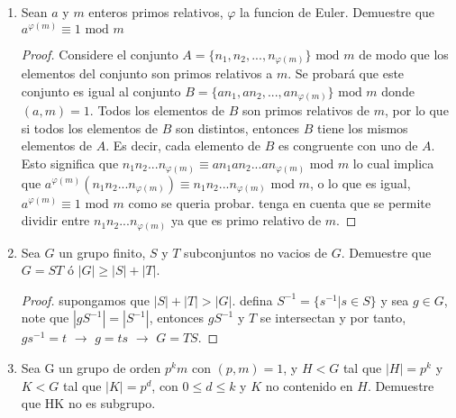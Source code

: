 \documentclass{article}
\theoremstyle{break}
\begin{document}
\begin{enumerate}
\begin{proof}
			Sea $m$ el numero de subgrupos de $G$, sabemos que $<g>$ es el subgrupo mas pequeño que contiene a $g$. Asi, fije $g_1\in G\backslash\{e\}$. Si $<g_1>=G$ termina la prueba, de lo contrario, considere $g_2\in G\backslash\{e\cup<g_1>\}$. Si $<g_1>\cup <g_2>=G$ entonces termina la prueba. Aplicando este razonamiendo, existe un $n\in\mathbb{N}$, con $n\leq m$ tal que 
			
			$$
			G=\displaystyle\bigcup_{i=1}^{n}{<g_i>}
			$$
			Pues de lo contrario $G$ contendria mas subgrupos que los $m$ existentes, lo cual no ocurre.
			Y como cada $<g_i>$ es finito, la union de todos ellos tambien es finita, luego G es finito.
		\end{proof}
		
		\item Sean $a$ y $m$ enteros primos relativos, $\varphi$ la funcion de Euler. Demuestre que $a^{\varphi (m)}\equiv 1 \mbox{ mod }m$
		
		\begin{proof}
			Considere el conjunto $A=\{n_1,n_2,...,n_{\varphi(m)}\}\mbox{ mod } m$ de modo que los elementos del conjunto son primos relativos a $m$. Se probar\'a que este conjunto es igual al conjunto $B=\{an_1,an_2,...,an_{\varphi (m)}\}\mbox{ mod }m$ donde $(a,m)=1$. Todos los elementos de $B$ son primos relativos de $m$, por lo que si todos los elementos de $B$ son distintos, entonces $B$ tiene los mismos elementos de $A$. Es decir, cada elemento de $B$ es congruente con uno de $A$. Esto significa que $n_1n_2...n_{\varphi(m)}\equiv an_1an_2...an_{\varphi(m)} \mbox{ mod }m$ lo cual implica que $a^{\varphi(m)}(n_1n_2...n_{\varphi(m)})\equiv n_1n_2...n_{\varphi(m)}\mbox{ mod }m$, o lo que es igual, $a^{\varphi(m)}\equiv 1\mbox{ mod }m$ como se queria probar. tenga en cuenta que se permite dividir entre $n_1n_2...n_{\varphi(m)}$ ya que es primo relativo de $m$.
		\end{proof}
		
		\item Sea $G$ un grupo finito, $S$ y $T$ subconjuntos no vacios de $G$. Demuestre que $G=ST$ \'o $|G|\geq |S|+|T|$.
		
		\begin{proof}
			supongamos que $|S|+|T|>|G|$. defina $S^{-1}=\{s^{-1}|s\in S\}$ y sea $g\in G$, note que $|gS^{-1}|=|S^{-1}|$, entonces $gS^{-1}$ y $T$ se intersectan y por tanto, $gs^{-1}=t$ $\rightarrow$ $g=ts$ $\rightarrow$ $G=TS$.
		\end{proof}
		
		\item Sea G un grupo de orden $p^{k}m$ con $(p,m)=1$, y $H<G$ tal que $|H|=p^{k}$ y $K<G$ tal que $|K|=p^d$, con $0\leq d\leq k$ y $K$ no contenido en $H$. Demuestre que HK no es subgrupo.
		

\end{enumerate}
\end{document}
